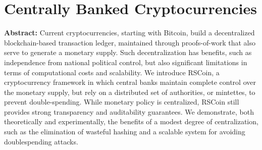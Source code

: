 \section{Centrally Banked Cryptocurrencies}

\textbf{Abstract:} 
Current cryptocurrencies, starting with Bitcoin, build a decentralized blockchain-based transaction ledger, maintained through proofs-of-work that also serve to generate a monetary supply. Such decentralization has benefits, such as independence from national political control, but also significant limitations in terms of computational costs and scalability. We introduce RSCoin, a cryptocurrency framework in which central banks maintain complete control over the monetary supply, but rely on a distributed set of authorities, or mintettes, to prevent double-spending. While monetary policy is centralized, RSCoin still provides strong transparency and auditability guarantees. We demonstrate, both theoretically and experimentally, the benefits of a modest degree of centralization, such as the elimination of wasteful hashing and a scalable system for avoiding doublespending attacks.
